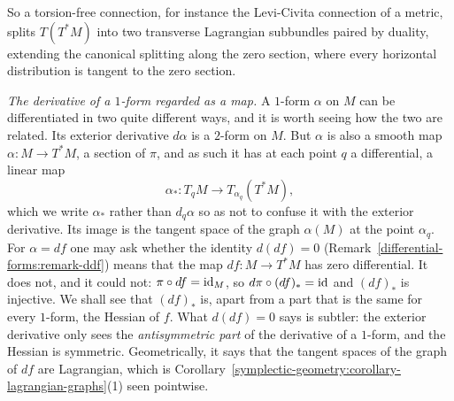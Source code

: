 So a torsion-free connection, for instance the Levi-Civita connection of a metric, splits $T(T^*M)$ into two transverse Lagrangian subbundles paired by duality, extending the canonical splitting along the
zero section, where every horizontal distribution is tangent to the zero section.

\emph{The derivative of a $1$-form regarded as a map.} A $1$-form $\alpha$ on $M$ can be differentiated in two quite different ways, and it is worth seeing how the two are related. Its
exterior derivative $d\alpha$ is a $2$-form on $M$. But $\alpha$ is also a smooth map $\alpha \colon M \to T^*M$, a section of $\pi$, and as such it has at each point $q$ a differential, a linear map
\[
\alpha_* \colon T_qM \to T_{\alpha_q}(T^*M),
\]
which we write $\alpha_*$ rather than $d_q\alpha$ so as not to confuse it with the exterior derivative. Its image is the tangent space of the graph $\alpha(M)$ at the point $\alpha_q$. For $\alpha = df$ one may
ask whether the identity $d(df) = 0$ (Remark~\ref{differential-forms:remark-ddf}) means that the map $df \colon M \to T^*M$ has zero differential. It does not, and it could not: $\pi \circ df = \mathrm{id}_M$, so
$d\pi \circ (df)_* = \mathrm{id}$ and $(df)_*$ is injective. We shall see that $(df)_*$ is, apart from a part that is the same for every $1$-form, the Hessian of $f$. What $d(df) = 0$ says is subtler: the exterior
derivative only sees the \emph{antisymmetric part} of the derivative of a $1$-form, and the Hessian is symmetric. Geometrically, it says that the tangent spaces of the graph of $df$ are Lagrangian, which is
Corollary~\ref{symplectic-geometry:corollary-lagrangian-graphs}(1) seen pointwise.

